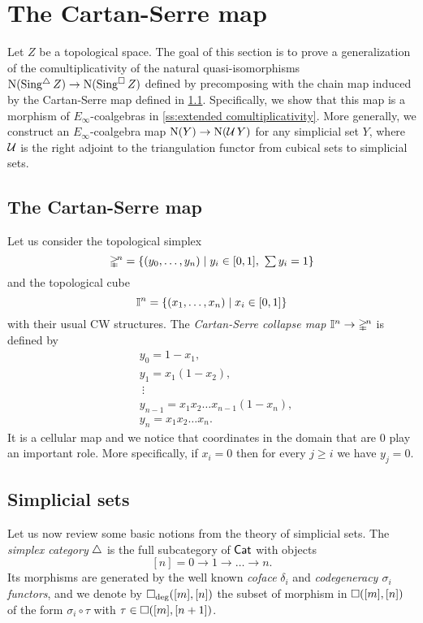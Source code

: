 
\section{The Cartan-Serre map} \label{s:the cartan-serre map}

Let $Z$ be a topological space.
The goal of this section is to prove a generalization of the comultiplicativity of the natural quasi-isomorphisms $\operatorname{N}(\operatorname{Sing^{\triangle}} Z) \to \operatorname{N}(\operatorname{Sing^{\square}} Z)$ defined by precomposing with the chain map induced by the Cartan-Serre map defined in \cref{ss:the cartan-serre map}.
Specifically, we show that this map is a morphism of $E_\infty$-coalgebras in \cref{ss:extended comultiplicativity}.
More generally, we construct an $E_\infty$-coalgebra map $\operatorname{N}(Y) \to \operatorname{N}(\operatorname{\mathcal{U}} Y)$ for any simplicial set $Y$, where $\operatorname{\mathcal{U}}$ is the right adjoint to the triangulation functor from cubical sets to simplicial sets.

\subsection{The Cartan-Serre map} \label{ss:the cartan-serre map}

Let us consider the topological simplex
\[
\mathbb{\Delta}^{\!n} = \{(y_0, \dots, y_n) \mid y_i \in [0,1], \ \textstyle{\sum} \, y_i = 1\}
\]
and the topological cube
\[
\mathbb{I}^{n} = \{(x_1, \dots, x_n) \mid x_i \in [0,1]\}
\]
with their usual CW structures.
The \textit{Cartan-Serre collapse map} $\mathbb{I}^n \to \mathbb{\Delta}^{\!n}$ is defined by
\begin{equation} \label{e:cartan-serre CW map}
\begin{split}
&y_0 = 1 - x_1, \\
&y_1 = x_1(1 - x_2), \\
&\ \vdots \\
&y_{n-1} = x_1 x_2 \dots x_{n-1}(1-x_n), \\
&y_{n} = x_1 x_2 \dots x_n.
\end{split}
\end{equation}
It is a cellular map and we notice that coordinates in the domain that are $0$ play an important role.
More specifically, if $x_i = 0$ then for every $j \geq i$ we have $y_{j} = 0$.

\subsection{Simplicial sets} \label{ss:simplicial sets}

Let us now review some basic notions from the theory of simplicial sets.
The \textit{simplex category} $\triangle$ is the full subcategory of $\mathsf{Cat}$ with objects
\[
[n] = 0 \to 1 \to \dots \to n.
\]
Its morphisms are generated by the well known \textit{coface} $\delta_i$ and \textit{codegeneracy $\sigma_i$ functors}, and we denote by $\square_{\deg}([m], [n])$ the subset of morphism in $\square([m], [n])$ of the form $\sigma_i \circ \tau$ with $\tau \in \square([m], [n+1])$.


